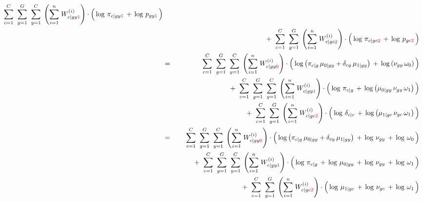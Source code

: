 \begin{eqnarray*}
	\overset{C}{\underset{c=1}{\sum}}\;\;
	\overset{G}{\underset{g=1}{\sum}}\;\;
	\overset{C}{\underset{y=1}{\sum}}\;
	\left(\overset{n}{\underset{i=1}{\sum}}\;W^{(i)}_{c \vert gy{\color{red}1}}\right)
	\cdot
	\left(\,
		\log\,\pi_{c \vert gy\color{red}1} \,\overset{{\color{white}.}}{+}\, \log\,p_{gy\color{red}1}
	\,\right)
\\
&&
	+ \;\;
	\overset{C}{\underset{c=1}{\sum}}\;\;
	\overset{G}{\underset{g=1}{\sum}}\;
	\left(\overset{n}{\underset{i=1}{\sum}}\;W^{(i)}_{c \vert gc{\color{red}2}}\right)
	\cdot
	\left(\,
		\log\,\pi_{c \vert gc\color{red}2} \,\overset{{\color{white}.}}{+}\, \log\,p_{gc\color{red}2}
	\,\right)
\\
&=&
	{\color{white}+} \;\;
	\overset{C}{\underset{c=1}{\sum}}\;\;
	\overset{G}{\underset{g=1}{\sum}}\;\;
	\overset{C}{\underset{y=1}{\sum}}\;
	\left(\overset{n}{\underset{i=1}{\sum}}\;W^{(i)}_{c \vert gy{\color{red}0}}\right)
	\cdot
	\left(\,
		\log\left(\pi_{c \vert g}\,\mu_{0 \vert gy} + \delta_{cy}\,\mu_{1\vert gy}\right)
		\,\overset{{\color{white}.}}{+}\,
		\log\left(\nu_{gy}\,\omega_{0}\right)
	\,\right)
\\
&&
	+ \;\;
	\overset{C}{\underset{c=1}{\sum}}\;\;
	\overset{G}{\underset{g=1}{\sum}}\;\;
	\overset{C}{\underset{y=1}{\sum}}\;
	\left(\overset{n}{\underset{i=1}{\sum}}\;W^{(i)}_{c \vert gy{\color{red}1}}\right)
	\cdot
	\left(\,
		\log\,\pi_{c \vert g}
		\,\overset{{\color{white}.}}{+}\,
		\log\left(\mu_{0\vert gy}\,\nu_{gy}\,\omega_{1}\right)
	\,\right)
\\
&&
	+ \;\;
	\overset{C}{\underset{c=1}{\sum}}\;\;
	\overset{G}{\underset{g=1}{\sum}}\;
	\left(\overset{n}{\underset{i=1}{\sum}}\;W^{(i)}_{c \vert gc{\color{red}2}}\right)
	\cdot
	\left(\,
		\log\,\delta_{c \vert c}
		\,\overset{{\color{white}.}}{+}\,
		\log\left(\mu_{1 \vert gc}\,\nu_{gc}\,\omega_{1}\right)
	\,\right)
\\
&=&
	{\color{white}+} \;\;
	\overset{C}{\underset{c=1}{\sum}}\;\;
	\overset{G}{\underset{g=1}{\sum}}\;\;
	\overset{C}{\underset{y=1}{\sum}}\;
	\left(\overset{n}{\underset{i=1}{\sum}}\;W^{(i)}_{c \vert gy{\color{red}0}}\right)
	\cdot
	\left(\,
		\log\left(\pi_{c \vert g}\,\mu_{0 \vert gy} + \delta_{cy}\,\mu_{1\vert gy}\right)
		\,\overset{{\color{white}.}}{+}\,
		\log\,\nu_{gy}
		\,\overset{{\color{white}.}}{+}\,
		\log\,\omega_{0}
	\,\right)
\\
&&
	+ \;\;
	\overset{C}{\underset{c=1}{\sum}}\;\;
	\overset{G}{\underset{g=1}{\sum}}\;\;
	\overset{C}{\underset{y=1}{\sum}}\;
	\left(\overset{n}{\underset{i=1}{\sum}}\;W^{(i)}_{c \vert gy{\color{red}1}}\right)
	\cdot
	\left(\,
		\log\,\pi_{c \vert g}
		\,\overset{{\color{white}.}}{+}\,
		\log\,\mu_{0\vert gy}
		\,\overset{{\color{white}.}}{+}\,
		\log\,\nu_{gy}
		\,\overset{{\color{white}.}}{+}\,
		\log\,\omega_{1}
	\,\right)
\\
&&
	+ \;\;
	\overset{C}{\underset{c=1}{\sum}}\;\;
	\overset{G}{\underset{g=1}{\sum}}\;
	\left(\overset{n}{\underset{i=1}{\sum}}\;W^{(i)}_{c \vert gc{\color{red}2}}\right)
	\cdot
	\left(\,
		\log\,\mu_{1 \vert gc}
		\,\overset{{\color{white}.}}{+}\,
		\log\,\nu_{gc}
		\,\overset{{\color{white}.}}{+}\,
		\log\,\omega_{1}
	\,\right)
\end{eqnarray*}

